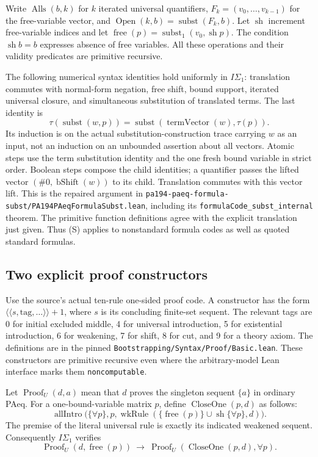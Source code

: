 Write $\operatorname{Alls}(b,k)$ for $k$ iterated universal quantifiers,
$F_k=(v_0,\ldots,v_{k-1})$ for the free-variable vector, and
$\operatorname{Open}(k,b)=\operatorname{subst}(F_k,b)$.
Let $\operatorname{sh}$ increment free-variable indices and let
$\operatorname{free}(p)=\operatorname{subst}_1(v_0,\operatorname{sh}p)$.
The condition $\operatorname{sh}b=b$ expresses absence of free variables.
All these operations and their validity predicates are primitive recursive.

The following numerical syntax identities hold uniformly in $I\Sigma_1$:
translation commutes with normal-form negation, free shift, bound support,
iterated universal closure, and simultaneous substitution of translated
terms.  The last identity is
\[
 \tau(\operatorname{subst}(w,p))
 =\operatorname{subst}(\operatorname{termVector}(w),\tau(p)) . \tag{S}
\]
Its induction is on the actual substitution-construction trace carrying
$w$ as an input, not an induction on an unbounded assertion about all
vectors.  Atomic steps use the term substitution identity and the one
fresh bound variable in strict order.  Boolean steps compose the child
identities; a quantifier passes the lifted vector
$(\#0,\operatorname{bShift}(w))$ to its child.  Translation commutes with
this vector lift.  This is the repaired argument in
\texttt{pa194-paeq-formula-subst/PA194PAeqFormulaSubst.lean}, including its
\texttt{formulaCode\_subst\_internal} theorem.  The primitive function
definitions agree with the explicit translation just given.  Thus (S)
applies to nonstandard formula codes as well as quoted standard formulas.

\subsection{Two explicit proof constructors}

Use the source's actual ten-rule one-sided proof code.  A constructor has
the form $\langle\!\langle s,\mathrm{tag},\ldots\rangle\!\rangle+1$,
where $s$ is its concluding finite-set sequent.  The relevant tags are
0 for initial excluded middle, 4 for universal introduction, 5 for
existential introduction, 6 for weakening, 7 for shift, 8 for cut,
and 9 for a theory axiom.  The definitions are in the pinned
\texttt{Bootstrapping/Syntax/Proof/Basic.lean}.  These constructors are
primitive recursive even where the arbitrary-model Lean interface marks
them \texttt{noncomputable}.

Let $\operatorname{Proof}_U(d,a)$ mean that $d$ proves the singleton
sequent $\{a\}$ in ordinary PAeq.  For a one-bound-variable matrix $p$,
define $\operatorname{CloseOne}(p,d)$ as follows:
\[
 \operatorname{allIntro}\bigl(\{\forall p\},p,
   \operatorname{wkRule}(\{\operatorname{free}(p)\}
        \cup\operatorname{sh}\{\forall p\},d)\bigr).       \tag{C1}
\]
The premise of the literal universal rule is exactly its indicated
weakened sequent.  Consequently $I\Sigma_1$ verifies
\[
 \operatorname{Proof}_U(d,\operatorname{free}(p))
 \ \longrightarrow\ \operatorname{Proof}_U(\operatorname{CloseOne}(p,d),\forall p).
\]

